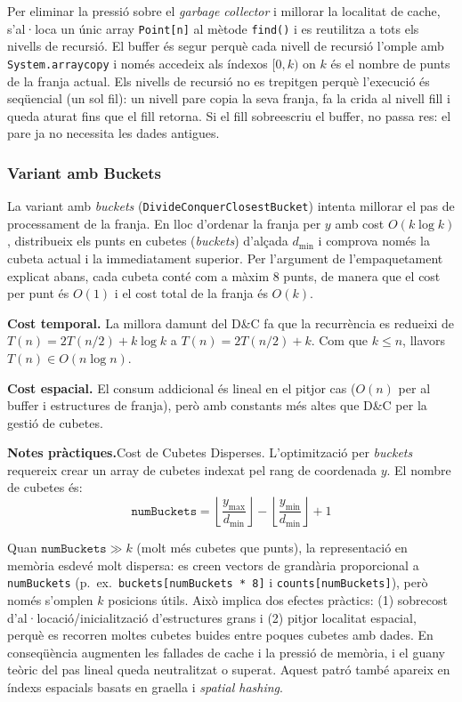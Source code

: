 \documentclass[conference,compsoc]{IEEEtran}
\begin{document}
Per eliminar la pressió sobre el \textit{garbage collector} i millorar
la localitat de cache, s'al·loca un únic array \texttt{Point[n]} al
mètode \texttt{find()} i es reutilitza a tots els nivells de recursió.
El buffer és segur perquè cada nivell de recursió l'omple amb
\texttt{System.arraycopy} i només accedeix als índexos $[0, k)$
on $k$ és el nombre de punts de la franja actual. Els nivells de
recursió no es trepitgen perquè l'execució és seqüencial (un sol fil):
un nivell pare copia la seva franja, fa la crida al nivell fill i queda
aturat fins que el fill retorna. Si el fill sobreescriu el buffer, no
passa res: el pare ja no necessita les dades antigues.

\subsubsection{Variant amb Buckets}
\label{sec:bucket}

La variant amb \textit{buckets} (\texttt{DivideConquerClosestBucket})
intenta millorar el pas de processament de la franja. En lloc
d'ordenar la franja per $y$ amb cost $O(k \log k)$, distribueix els
punts en cubetes (\textit{buckets}) d'alçada $d_{\min}$ i comprova
només la cubeta actual i la immediatament superior. Per l'argument de
l'empaquetament explicat abans, cada cubeta conté com a màxim 8 punts, de manera
que el cost per punt és $O(1)$ i el cost total de la franja és $O(k)$.

\textbf{Cost temporal.} La millora damunt del D\&C fa que la recurrència es redueixi de
$T(n) = 2T(n/2) + k \log k$ a $T(n) = 2T(n/2) + k$.
Com que $k \leq n$, llavors $T(n)\in O(n \log n)$.

\textbf{Cost espacial.} El consum addicional és lineal en el pitjor cas
($O(n)$ per al buffer i estructures de franja), però amb constants més
altes que D\&C per la gestió de cubetes.

\textbf{Notes pràctiques.}Cost de Cubetes Disperses.
L'optimització per \textit{buckets} requereix crear un array de
cubetes indexat pel rang de coordenada $y$. El nombre de cubetes
és:
\begin{equation}
\texttt{numBuckets} = \left\lfloor \frac{y_{\max}}{d_{\min}} \right\rfloor - \left\lfloor \frac{y_{\min}}{d_{\min}} \right\rfloor + 1
\end{equation}

Quan $\texttt{numBuckets} \gg k$ (molt més cubetes que punts), la
representació en memòria esdevé molt dispersa: es creen vectors de
grandària proporcional a \texttt{numBuckets} (p.~ex.\
\texttt{buckets[numBuckets * 8]} i \texttt{counts[numBuckets]}), però
només s'omplen $k$ posicions útils. Això implica dos efectes pràctics:
(1) sobrecost d'al·locació/inicialització d'estructures grans i
(2) pitjor localitat espacial, perquè es recorren moltes cubetes buides
entre poques cubetes amb dades. En conseqüència augmenten les fallades
de cache i la pressió de memòria, i el guany teòric del pas lineal queda
neutralitzat o superat. Aquest patró també apareix en índexs espacials
basats en graella i \textit{spatial hashing}.
\end{document}
